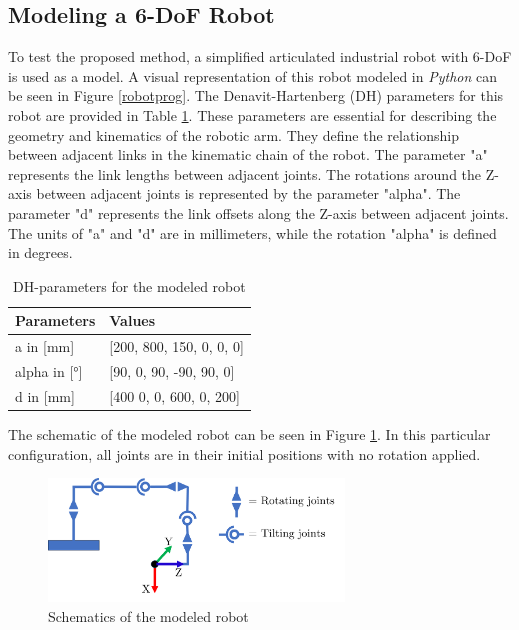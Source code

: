 \subsection{Modeling a 6-DoF Robot}
To test the proposed method, a simplified articulated industrial robot with 6-\acrshort{DoF} is used as a model. A visual representation of this robot modeled in \textit{Python} can be seen in Figure \ref{robotprog}. The Denavit-Hartenberg (\acrshort{DH}) parameters for this robot are provided in Table \ref{DHp}. These parameters are essential for describing the geometry and kinematics of the robotic arm. They define the relationship between adjacent links in the kinematic chain of the robot.
The parameter "a" represents the link lengths between adjacent joints. The rotations around the Z-axis between adjacent joints is represented by the parameter "alpha". The parameter "d" represents the link offsets along the Z-axis between adjacent joints. The units of "a" and "d" are in millimeters, while the rotation "alpha" is defined in degrees.


\begin{table}[H]
	\centering
	\caption{DH-parameters for the modeled robot}
	\begin{tabular}{||l|l||}
		Parameters  & Values \\
		\hline
		\hline
		\hline
		a in [mm] 	&		[200, 800, 150, 0,   0, 0] \\
		alpha in [°]	&  	[90,  0,   90,  -90, 90,  0] \\
		d in [mm]	& 		[400  0,   0,   600, 0,   200]\\
		
		\hline
		\hline
	\end{tabular}
	

	\label{DHp}
\end{table}


The schematic of the modeled robot can be seen in Figure \ref{schema}. In this particular configuration, all joints are in their initial positions with no rotation applied.\newline

\begin{figure}[H]
	\centerline{\includegraphics[width=0.7\textwidth]{figures/schema.png}}
	\caption{Schematics of the modeled robot}
	\label{schema}
\end{figure}


